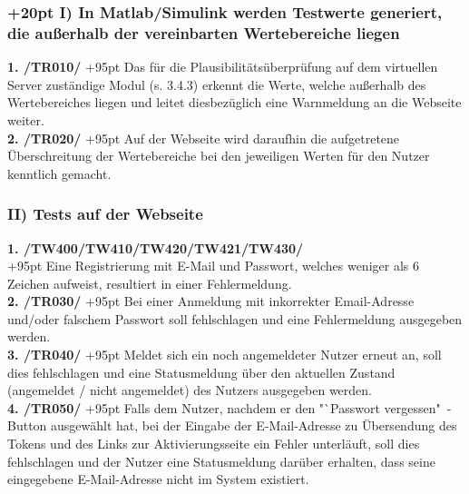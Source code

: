 \documentclass[fontsize = 12pt, paper = a4]{scrreprt}
\begin{document}
\subsubsection*{
\hangindent+20pt 
I) In Matlab/Simulink werden Testwerte generiert, die außerhalb der vereinbarten Wertebereiche liegen \\} 

\vspace*{3mm}

\textbf{1. /TR010/}
\hangindent+95pt 
\hspace*{8mm}
Das für die Plausibilitätsüberprüfung auf dem virtuellen Server zuständige Modul (s. 3.4.3) erkennt die Werte, welche außerhalb des Wertebereiches liegen und leitet diesbezüglich eine Warnmeldung an die Webseite weiter. \\

\textbf{2. /TR020/}
\hangindent+95pt 
\hspace*{5.5mm}
Auf der Webseite wird daraufhin die aufgetretene Überschreitung der Wertebereiche bei den jeweiligen Werten für den Nutzer kenntlich gemacht.



\subsubsection*{II) Tests auf der Webseite}

\vspace*{3mm}

\textbf{1. /TW400/TW410/TW420/TW421/TW430/}\\
\hangindent+95pt 
Eine Registrierung mit E-Mail und Passwort, welches weniger als 6 Zeichen aufweist, resultiert in einer Fehlermeldung.\\

\textbf{2. /TR030/}
\hangindent+95pt 
\hspace*{8mm}
Bei einer Anmeldung mit inkorrekter Email-Adresse und/oder falschem Passwort soll fehlschlagen und eine Fehlermeldung ausgegeben werden. \\

\textbf{3. /TR040/}
\hangindent+95pt 
\hspace*{6.5mm}
Meldet sich ein noch angemeldeter Nutzer erneut an, soll dies fehlschlagen und eine Statusmeldung über den aktuellen Zustand (angemeldet / nicht angemeldet) des Nutzers ausgegeben werden. \\

\textbf{4. /TR050/}
\hangindent+95pt 
\hspace*{5.5mm}
Falls dem Nutzer, nachdem er den "`Passwort vergessen"\ - Button ausgewählt hat, bei der Eingabe der E-Mail-Adresse zu Übersendung des Tokens und des Links zur Aktivierungsseite ein Fehler unterläuft, soll dies fehlschlagen und der Nutzer eine Statusmeldung darüber erhalten, dass seine eingegebene E-Mail-Adresse nicht im System existiert.  
\end{document}
